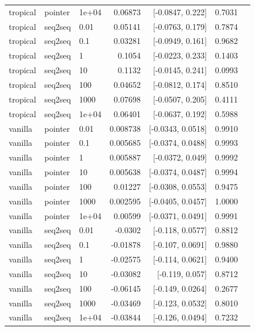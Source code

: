 \documentclass[10pt]{article}
\begin{document}
{\begin{longtable}{lllrrrl}
tropical & pointer & 1e+04 & 0.06873 & [-0.0847, 0.222] & 0.7031 & \\
tropical & seq2seq & 0.01 & 0.05141 & [-0.0763, 0.179] & 0.7874 & \\
tropical & seq2seq & 0.1 & 0.03281 & [-0.0949, 0.161] & 0.9682 & \\
tropical & seq2seq & 1 & 0.1054 & [-0.0223, 0.233] & 0.1403 & \\
tropical & seq2seq & 10 & 0.1132 & [-0.0145, 0.241] & 0.0993 & \\
tropical & seq2seq & 100 & 0.04652 & [-0.0812, 0.174] & 0.8510 & \\
tropical & seq2seq & 1000 & 0.07698 & [-0.0507, 0.205] & 0.4111 & \\
tropical & seq2seq & 1e+04 & 0.06401 & [-0.0637, 0.192] & 0.5988 & \\
vanilla & pointer & 0.01 & 0.008738 & [-0.0343, 0.0518] & 0.9910 & \\
vanilla & pointer & 0.1 & 0.005685 & [-0.0374, 0.0488] & 0.9993 & \\
vanilla & pointer & 1 & 0.005887 & [-0.0372, 0.049] & 0.9992 & \\
vanilla & pointer & 10 & 0.005638 & [-0.0374, 0.0487] & 0.9994 & \\
vanilla & pointer & 100 & 0.01227 & [-0.0308, 0.0553] & 0.9475 & \\
vanilla & pointer & 1000 & 0.002595 & [-0.0405, 0.0457] & 1.0000 & \\
vanilla & pointer & 1e+04 & 0.00599 & [-0.0371, 0.0491] & 0.9991 & \\
vanilla & seq2seq & 0.01 & -0.0302 & [-0.118, 0.0577] & 0.8812 & \\
vanilla & seq2seq & 0.1 & -0.01878 & [-0.107, 0.0691] & 0.9880 & \\
vanilla & seq2seq & 1 & -0.02575 & [-0.114, 0.0621] & 0.9400 & \\
vanilla & seq2seq & 10 & -0.03082 & [-0.119, 0.057] & 0.8712 & \\
vanilla & seq2seq & 100 & -0.06145 & [-0.149, 0.0264] & 0.2677 & \\
vanilla & seq2seq & 1000 & -0.03469 & [-0.123, 0.0532] & 0.8010 & \\
vanilla & seq2seq & 1e+04 & -0.03844 & [-0.126, 0.0494] & 0.7232 & \\
\bottomrule
\end{longtable}
}
\end{document}
